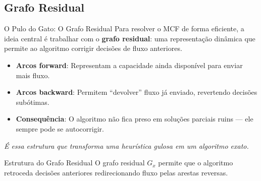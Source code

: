 \subsection{Grafo Residual}
\begin{frame}{O Pulo do Gato: O Grafo Residual}
  Para resolver o MCF de forma eficiente, a ideia central é trabalhar com o \textbf{grafo residual}: uma representação dinâmica que permite ao algoritmo corrigir decisões de fluxo anteriores.

  \begin{itemize}
    \item \textbf{Arcos forward}: Representam a capacidade ainda disponível para enviar mais fluxo.
    \item \textbf{Arcos backward}: Permitem ``devolver'' fluxo já enviado, revertendo decisões subótimas.
    \item \textbf{Consequência}: O algoritmo não fica preso em soluções parciais ruins --- ele sempre pode se autocorrigir.
  \end{itemize}

  \begin{center}
    \scriptsize \textit{É essa estrutura que transforma uma heurística gulosa em um algoritmo exato.}
  \end{center}
\end{frame}

\begin{frame}{Estrutura do Grafo Residual}
  O grafo residual $G_x$ permite que o algoritmo retroceda decisões anteriores redirecionando fluxo pelas arestas reversas.
  
  \vspace{0.3cm}
  \centering
\end{frame}

